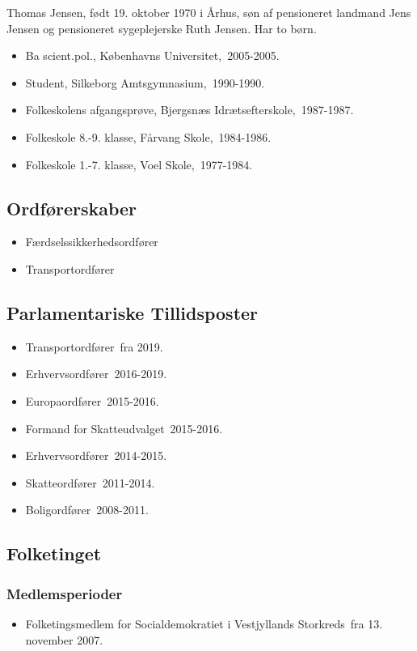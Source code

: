 \documentclass[11pt, a4paper]{awesome-cv}
\begin{document}
\makecvheader[R]
\makelettertitle
\begin{cvletter}
Thomas Jensen, født 19. oktober 1970 i Århus, søn af pensioneret landmand Jens Jensen og pensioneret sygeplejerske Ruth Jensen. Har to børn. 

\begin{itemize}
\item Ba scient.pol., Københavns Universitet, 2005-2005.
\item Student, Silkeborg Amtsgymnasium, 1990-1990.
\item Folkeskolens afgangsprøve, Bjergsnæs Idrætsefterskole, 1987-1987.
\item Folkeskole 8.-9. klasse, Fårvang Skole, 1984-1986.
\item Folkeskole 1.-7. klasse, Voel Skole, 1977-1984.
\end{itemize}
\subsection*{Ordførerskaber}
\begin{itemize}
\item Færdselssikkerhedsordfører
\item Transportordfører
\end{itemize}
\subsection*{Parlamentariske Tillidsposter}
\begin{itemize}
\item Transportordfører fra 2019.
\item Erhvervsordfører 2016-2019.
\item Europaordfører 2015-2016.
\item Formand for Skatteudvalget 2015-2016.
\item Erhvervsordfører 2014-2015.
\item Skatteordfører 2011-2014.
\item Boligordfører 2008-2011.
\end{itemize}
\subsection*{Folketinget}
\subsubsection*{Medlemsperioder}
\begin{itemize}
\item Folketingsmedlem for Socialdemokratiet i Vestjyllands Storkreds fra 13. november 2007.
\end{itemize}

\end{cvletter}
\end{document}
